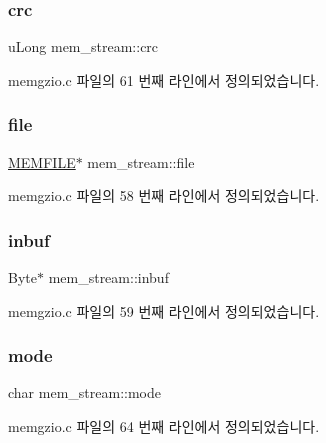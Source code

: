 \subsubsection{\texorpdfstring{crc}{crc}}
{\footnotesize\ttfamily u\+Long mem\+\_\+stream\+::crc}



memgzio.\+c 파일의 61 번째 라인에서 정의되었습니다.

\mbox{\label{structmem__stream_a3bba5271c2ba53db444ce0b70d1c6fe1}} 
\subsubsection{\texorpdfstring{file}{file}}
{\footnotesize\ttfamily \mbox{\hyperlink{memgzio_8c_aebbc1e519147882ded18ad14979fe817}{M\+E\+M\+F\+I\+LE}}$\ast$ mem\+\_\+stream\+::file}



memgzio.\+c 파일의 58 번째 라인에서 정의되었습니다.

\mbox{\label{structmem__stream_ad151b26e8ac236612276193c515b6e67}} 
\subsubsection{\texorpdfstring{inbuf}{inbuf}}
{\footnotesize\ttfamily Byte$\ast$ mem\+\_\+stream\+::inbuf}



memgzio.\+c 파일의 59 번째 라인에서 정의되었습니다.

\mbox{\label{structmem__stream_a30a6ad1cea6962847c45dd540d702f6f}} 
\subsubsection{\texorpdfstring{mode}{mode}}
{\footnotesize\ttfamily char mem\+\_\+stream\+::mode}



memgzio.\+c 파일의 64 번째 라인에서 정의되었습니다.

\mbox{\label{structmem__stream_a8b64f897dff31431aaf6608e32996e26}} 
